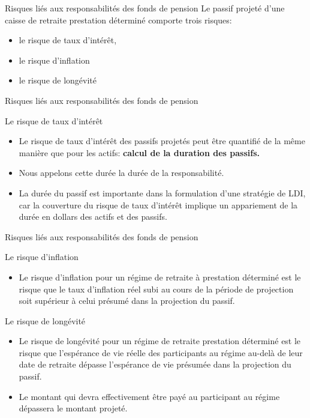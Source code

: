\documentclass{beamer}
\begin{document}
\begin{frame}{Risques liés aux responsabilités des fonds de pension}
Le passif projeté d’une caisse de retraite prestation déterminé comporte trois risques:
\begin{itemize}[label=\bullet]
\item le risque de taux d’intérêt,
\item le risque d’inflation 
\item le risque de longévité
\end{itemize}
\end{frame}

\begin{frame}{Risques liés aux responsabilités des fonds de pension}
\begin{block}{Le risque de taux d’intérêt}
\begin{itemize}[label=\bullet]
\item Le risque de taux d'intérêt des passifs projetés peut être quantifié de la même manière que pour les actifs: \textbf{calcul de la duration des passifs.} 
\item Nous appelons cette durée la durée de la responsabilité.
\item La durée du passif est importante dans la formulation d'une stratégie de LDI, car la couverture du risque de taux d'intérêt implique un appariement de la durée en dollars des actifs et des passifs.
\end{itemize}
\end{block}
\end{frame}

\begin{frame}{Risques liés aux responsabilités des fonds de pension}
\begin{block}{Le risque d'inflation}
\begin{itemize}[label=\bullet]
\item Le risque d'inflation pour un régime de retraite à prestation déterminé est le risque que le taux d'inflation réel subi au cours de la période de projection soit supérieur à celui présumé dans la projection du passif.
\end{itemize}
\end{block}
\begin{block}{Le risque de longévité}
\begin{itemize}[label=\bullet]
\item Le risque de longévité pour un régime de retraite prestation déterminé est le risque que l'espérance de vie réelle des participants au régime au-delà de leur date de retraite dépasse l'espérance de vie présumée dans la projection du passif.
\item Le montant qui devra effectivement être payé au participant au régime dépassera le montant projeté.
\end{itemize}
\end{block}
\end{frame}
\end{document}
